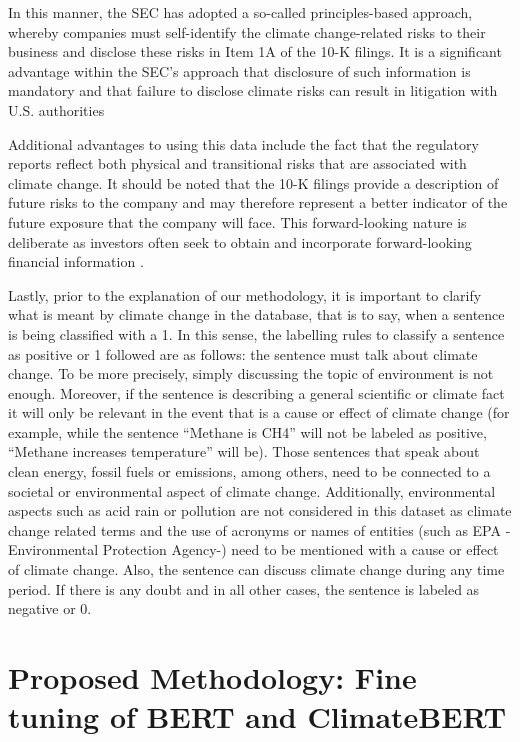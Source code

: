 \documentclass[runningheads]{llncs}
\begin{document}
In this manner, the SEC has adopted a so-called principles-based approach, whereby companies must self-identify the climate change-related risks to their business and disclose these risks in Item 1A of the 10-K filings. It is a significant advantage within the SEC's approach that disclosure of such information is mandatory and that failure to disclose climate risks can result in litigation with U.S. authorities \cite{kolbel2022ask}   

Additional advantages to using this data include the fact that the regulatory reports reflect both physical and transitional risks that are associated with climate change. It should be noted that the 10-K filings provide a description of future risks to the company and may therefore represent a better indicator of the future exposure that the company will face. This forward-looking nature is deliberate as investors often seek to obtain and incorporate forward-looking financial information \cite{kolbel2022ask}. 

Lastly, prior to the explanation of our methodology, it is important to clarify what is meant by climate change in the database, that is to say, when a sentence is being classified with a 1. In this sense, the labelling rules to classify a sentence as positive or 1 followed are as follows: the sentence must talk about climate change. To be more precisely, simply discussing the topic of environment is not enough. Moreover, if the sentence is describing a general scientific or climate fact it will only be relevant in the event that is a cause or effect of climate change (for example, while the sentence “Methane is CH4” will not be labeled as positive, “Methane increases temperature” will be). Those sentences that speak about clean energy, fossil fuels or emissions, among others, need to be connected to a societal or environmental aspect of climate change. Additionally, environmental aspects such as acid rain or pollution are not considered in this dataset as climate change related terms and the use of acronyms or names of entities (such as EPA -Environmental Protection Agency-) need to be mentioned with a cause or effect of climate change. Also, the sentence can discuss climate change during any time period. If there is any doubt and in all other cases, the sentence is labeled as negative or 0.   

\section{Proposed Methodology: Fine tuning of BERT and ClimateBERT}
\end{document}
